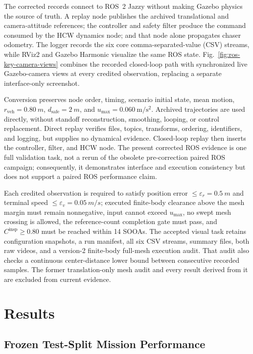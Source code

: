 \documentclass{IEEEtaes}
\newcommand{\unit}[2]{#1~#2}
\theoremstyle{remark}
\theoremstyle{plain}
\begin{document}
The corrected records connect to ROS~2 Jazzy without making Gazebo physics the source of truth. A replay node publishes the archived translational and camera-attitude references; the controller and safety filter produce the command consumed by the HCW dynamics node; and that node alone propagates chaser odometry. The logger records the six core comma-separated-value (CSV) streams, while RViz2 and Gazebo Harmonic visualize the same ROS state. Fig.~\ref{fig:ros-key-camera-views} combines the recorded closed-loop path with synchronized live Gazebo-camera views at every credited observation, replacing a separate interface-only screenshot.

Conversion preserves node order, timing, scenario initial state, mean motion, $r_{\mathrm{veh}}=\unit{0.80}{m}$, $d_{\mathrm{safe}}=\unit{2}{m}$, and $u_{\max}=0.060~\mathrm{m/s^2}$. Archived trajectories are used directly, without standoff reconstruction, smoothing, looping, or control replacement. Direct replay verifies files, topics, transforms, ordering, identifiers, and logging, but supplies no dynamical evidence. Closed-loop replay then inserts the controller, filter, and HCW node. The present corrected ROS evidence is one full validation task, not a rerun of the obsolete pre-correction paired ROS campaign; consequently, it demonstrates interface and execution consistency but does not support a paired ROS performance claim.

Each credited observation is required to satisfy position error $\le\varepsilon_r=\unit{0.5}{m}$ and terminal speed $\le\varepsilon_v=\unit{0.05}{m/s}$; executed finite-body clearance above the mesh margin must remain nonnegative, input cannot exceed $u_{\max}$, no swept mesh crossing is allowed, the reference-count completion gate must pass, and $C^{\mathrm{insp}}\ge0.80$ must be reached within 14 SOOAs. The accepted visual task retains configuration snapshots, a run manifest, all six CSV streams, summary files, both raw videos, and a version-2 finite-body full-mesh execution audit. That audit also checks a continuous center-distance lower bound between consecutive recorded samples. The former translation-only mesh audit and every result derived from it are excluded from current evidence.

\section{Results}
\label{sec:results}

\subsection{Frozen Test-Split Mission Performance}
\end{document}
